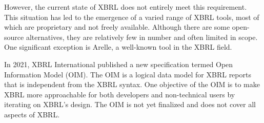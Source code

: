 However, the current state of XBRL does not entirely meet this requirement.
This situation has led to the emergence of a varied range of XBRL tools,
most of which are proprietary and not freely available.
Although there are some open-source alternatives,
they are relatively few in number and often limited in scope.
One significant exception is Arelle\cite{arelle}, a well-known tool in the XBRL field.


In 2021, XBRL International published a new specification termed Open Information Model (OIM)\cite{oim}.
The OIM is a logical data model for XBRL reports that is independent from the XBRL syntax.
One objective of the OIM is to make XBRL more approachable for both developers and non-technical users by iterating on XBRL's design.
The OIM is not yet finalized and does not cover all aspects of XBRL. 

